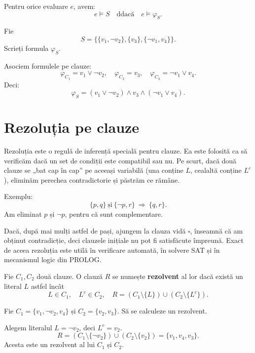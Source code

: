 \begin{prop}
	Pentru orice evaluare \(e\), avem:
	\[
		e \models S \quad \text{ddacă} \quad e \models \varphi_S.
	\]
\end{prop}

\begin{ex}
	Fie
	\[
		S = \{\{v_1, \neg v_2\}, \{v_3\}, \{\neg v_1, v_4\}\}.
	\]
	Scrieți formula \( \varphi_S \).
\end{ex}

\begin{solutie}
	Asociem formulele pe clauze:
	\[
		\varphi_{C_1} = v_1 \lor \neg v_2, \quad \varphi_{C_2} = v_3, \quad \varphi_{C_3} = \neg v_1 \lor v_4.
	\]
	Deci:
	\[
		\varphi_S = (v_1 \lor \neg v_2)\land v_3 \land (\neg v_1 \lor v_4).
	\]
\end{solutie}

\section{Rezoluția pe clauze}

Rezoluția este o regulă de inferență specială pentru clauze. Ea este folosită ca să verificăm dacă un set de condiții este compatibil sau nu. Pe scurt, dacă două clauze se „bat cap în cap” pe aceeași variabilă (una conține \(L\), cealaltă conține \(L^c\)), eliminăm perechea contradictorie și păstrăm ce rămâne.

Exemplu:
\[
	\{p, q\} \ \text{și}\ \{\neg p, r\} \ \Longrightarrow \ \{q, r\}.
\]
Am eliminat \(p\) și \(\neg p\), pentru că sunt complementare.

Dacă, după mai mulți astfel de pași, ajungem la clauza vidă \( \square \), înseamnă că am obținut contradicție, deci clauzele inițiale nu pot fi satisfăcute împreună. Exact de aceea rezoluția este utilă în verificare automată, în solvere SAT și în mecanismul logic din PROLOG.

\begin{definition}
	Fie \(C_1, C_2\) două clauze. O clauză \(R\) se numește \textbf{rezolvent} al lor dacă există un literal \(L\) astfel încât
	\[
		L \in C_1, \quad L^c \in C_2, \quad R = (C_1 \setminus \{L\}) \cup (C_2 \setminus \{L^c\}).
	\]
\end{definition}

\begin{ex}
	Fie \(C_1 = \{v_1, \neg v_2, v_4\}\) și \(C_2 = \{v_2, v_3\}\).
	Să se calculeze un rezolvent.
\end{ex}

\begin{solutie}
	Alegem literalul \(L = \neg v_2\), deci \(L^c = v_2\).
	\[
		R = (C_1 \setminus \{\neg v_2\}) \cup (C_2 \setminus \{v_2\}) = \{v_1, v_4, v_3\}.
	\]
	Acesta este un rezolvent al lui \(C_1\) și \(C_2\).
\end{solutie}

